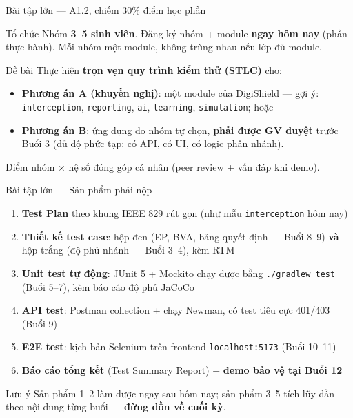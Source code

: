 \documentclass[aspectratio=169,12pt]{beamer}
\begin{document}
\begin{frame}{Bài tập lớn --- A1.2, chiếm 30\% điểm học phần}
  \begin{block}{Tổ chức}
    Nhóm \textbf{3--5 sinh viên}. Đăng ký nhóm + module \textbf{ngay hôm nay}
    (phần thực hành). Mỗi nhóm một module, không trùng nhau nếu lớp đủ module.
  \end{block}

  \vspace{0.3em}
  \begin{block}{Đề bài}
    Thực hiện \textbf{trọn vẹn quy trình kiểm thử (STLC)} cho:
    \begin{itemize}
      \item \textbf{Phương án A (khuyến nghị)}: một module của DigiShield ---
            gợi ý: \texttt{interception}, \texttt{reporting}, \texttt{ai},
            \texttt{learning}, \texttt{simulation}; hoặc
      \item \textbf{Phương án B}: ứng dụng do nhóm tự chọn, \textbf{phải được GV duyệt}
            trước Buổi 3 (đủ độ phức tạp: có API, có UI, có logic phân nhánh).
    \end{itemize}
  \end{block}

  \vspace{0.3em}
  \small Điểm nhóm $\times$ hệ số đóng góp cá nhân (peer review + vấn đáp khi demo).
\end{frame}

\begin{frame}{Bài tập lớn --- Sản phẩm phải nộp}
  \begin{enumerate}
    \item \textbf{Test Plan} theo khung IEEE 829 rút gọn (như mẫu \texttt{interception} hôm nay)
    \item \textbf{Thiết kế test case}: hộp đen (EP, BVA, bảng quyết định --- Buổi 8--9)
          \textbf{và} hộp trắng (độ phủ nhánh --- Buổi 3--4), kèm RTM
    \item \textbf{Unit test tự động}: JUnit 5 + Mockito chạy được bằng \texttt{./gradlew test}
          (Buổi 5--7), kèm báo cáo độ phủ JaCoCo
    \item \textbf{API test}: Postman collection + chạy Newman, có test tiêu cực
          401/403 (Buổi 9)
    \item \textbf{E2E test}: kịch bản Selenium trên frontend \texttt{localhost:5173}
          (Buổi 10--11)
    \item \textbf{Báo cáo tổng kết} (Test Summary Report) + \textbf{demo bảo vệ tại Buổi 12}
  \end{enumerate}

  \begin{alertblock}{Lưu ý}
    Sản phẩm 1--2 làm được ngay sau hôm nay; sản phẩm 3--5 tích lũy dần theo
    nội dung từng buổi --- \textbf{đừng dồn về cuối kỳ}.
  \end{alertblock}
\end{frame}
\end{document}
